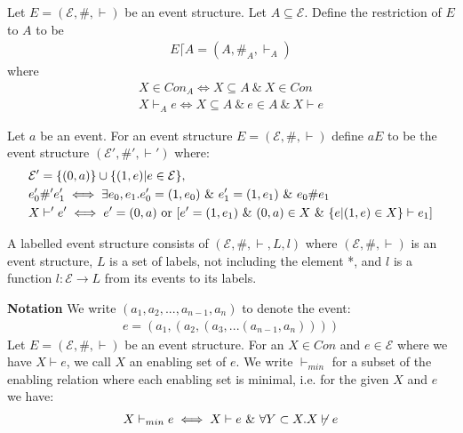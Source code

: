 \documentclass{article}
\begin{document}
\begin{definition}[Restriction]
Let $E = (\mathcal{E},\#,\vdash)$ be an event structure. 
Let $A \subseteq \mathcal{E}$.
Define the restriction of $E$ to $A$ to be
\begin{align*}
    E \lceil A = (A,\#_A,\vdash_A) 
\end{align*}
where
\begin{align*}
    X \in Con_A \iff X \subseteq A \ \& \ X \in Con \\
    X \vdash_A e \iff X \subseteq A \ \& \ e \in A \ \& \ X \vdash e
\end{align*}
\end{definition}

\begin{definition}
Let $a$ be an event.
For an event structure $E = (\mathcal{E},\#,\vdash)$ define $aE$ to be the event structure $(\mathcal{E'},\#',\vdash')$ where:
\begin{align*}
    & \mathcal{E'} = \s{(0,a)} \cup \s{(1,e)|e \in \mathcal{E}}, \\
    & e_0' \#' e_1'  \iff \exists e_0,e_1.e_0' = (1,e_0) 
    \ \& \ e_1' = (1,e_1) \ \& \ e_0 \# e_1 \\
    & X \vdash' e' \iff e' = (0,a) \text{ or } [e' = (1,e_1) \ \& \ (0,a)\in X \ \& \ \s{e|(1,e)\in X} \vdash e_1] 
\end{align*}
\end{definition}

\begin{definition}
A labelled event structure consists of $(\mathcal{E},\#,\vdash,L,l)$ where 
$(\mathcal{E},\#,\vdash)$ is an event structure, $L$ is a set of labels, 
not including the element *, and $l$ is a function $l: \mathcal{E} \rightarrow L$ 
from its events to its labels.
\end{definition}
\textbf{Notation}
We write $(a_1,a_2,...,a_{n-1},a_n)$ to denote the event:
\begin{align*}
     e = (a_1,(a_2,(a_3,...(a_{n-1},a_n))))
\end{align*}
Let $E = (\mathcal{E},\#,\vdash)$ be an event structure.
For an $X \in Con$ and $e \in \mathcal{E}$ where we have $X \vdash e$, we call $X$ an enabling set of $e$.
We write $\vdash_{min}$ for a subset of the enabling relation where each enabling set is minimal, i.e. for the 
given $X$ and $e$ we have:
\begin{align*}
    X \vdash_{min} e \iff X \vdash e \ \& \  \forall Y \subset X. X \not \vdash e
\end{align*}
\end{document}

